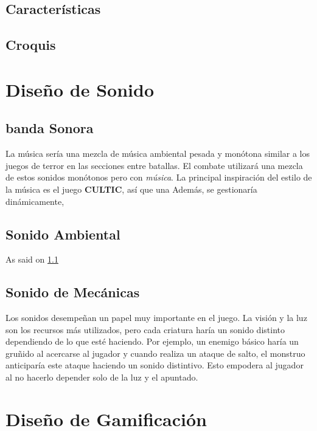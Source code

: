     \subsection{Características}

    \subsection{Croquis}

\section{Diseño de Sonido}
    \subsection{banda Sonora} \label{ost}
        La música sería una mezcla de música ambiental pesada y monótona similar a los juegos de terror en las secciones entre batallas. El combate utilizará una mezcla de estos sonidos monótonos pero con \textit{música}.
        La principal inspiración del estilo de la música es el juego \textbf{CULTIC}, así que una
        Además, se gestionaría dinámicamente,

    \subsection{Sonido Ambiental}
        As said on \ref{ost}
    \subsection{Sonido de Mecánicas}
        Los sonidos desempeñan un papel muy importante en el juego. La visión y la luz son los recursos más utilizados, pero cada criatura haría un sonido distinto dependiendo de lo que esté haciendo. Por ejemplo, un enemigo básico haría un gruñido al acercarse al jugador y cuando realiza un ataque de salto, el monstruo anticiparía este ataque haciendo un sonido distintivo. Esto empodera al jugador al no hacerlo depender solo de la luz y el apuntado.

\section{Diseño de Gamificación}
